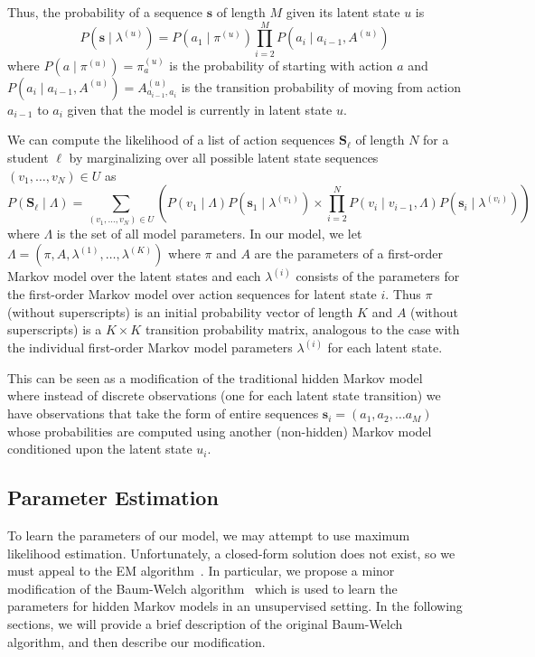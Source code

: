Thus, the probability of a sequence $\mathbf{s}$ of length $M$ given its
latent state $u$ is
\begin{equation}
  P(\mathbf{s} \mid \lambda^{(u)}) = P(a_1 \mid \pi^{(u)}) \prod_{i=2}^M P(a_i \mid
  a_{i-1}, A^{(u)})
\end{equation}
where $P(a \mid \pi^{(u)}) = \pi^{(u)}_a$ is the probability of starting
with action $a$ and $P(a_i \mid a_{i-1}, A^{(u)}) = A^{(u)}_{a_{i-1}, a_i}$
is the transition probability of moving from action $a_{i-1}$ to $a_{i}$
given that the model is currently in latent state $u$.

We can compute the likelihood of a list of action sequences
$\mathbf{S}_\ell$ of length $N$ for a student $\ell$ by marginalizing over
all possible latent state sequences $(v_1, \ldots, v_N) \in U$ as
\begin{equation}
  P(\mathbf{S}_\ell \mid \Lambda)
  = \sum_{(v_1, \ldots, v_N) \in U} \left(P(v_1 \mid \Lambda)
  P(\mathbf{s}_1 \mid \lambda^{(v_1)}) \times \prod_{i=2}^N P(v_i \mid
  v_{i-1}, \Lambda) P(\mathbf{s}_i \mid \lambda^{(v_i)})\right)
\end{equation}
where $\Lambda$ is the set of all model parameters.  In our model, we let
$\Lambda = (\pi, A, \lambda^{(1)}, \ldots, \lambda^{(K)})$ where $\pi$ and
$A$ are the parameters of a first-order Markov model over the latent states
and each $\lambda^{(i)}$ consists of the parameters for the first-order
Markov model over action sequences for latent state $i$. Thus $\pi$
(without superscripts) is an initial probability vector of length $K$ and
$A$ (without superscripts) is a $K \times K$ transition probability matrix,
analogous to the case with the individual first-order Markov model
parameters $\lambda^{(i)}$ for each latent state.

This can be seen as a modification of the traditional hidden Markov
model~\cite{Rabiner:1990:RSR} where instead of discrete observations (one
for each latent state transition) we have observations that take the form
of entire sequences $\mathbf{s}_i = (a_1, a_2, \ldots a_M)$ whose
probabilities are computed using another (non-hidden) Markov model
conditioned upon the latent state $u_i$.

\subsection{Parameter Estimation}
\label{sec:param-estimation}
To learn the parameters of our model, we may attempt to use maximum
likelihood estimation. Unfortunately, a closed-form solution does not
exist, so we must appeal to the EM algorithm~\cite{Dempster:1977:JRSS}. In
particular, we propose a minor modification of the Baum-Welch
algorithm~\cite{Rabiner:1990:RSR} which is used to learn the parameters for
hidden Markov models in an unsupervised setting. In the following sections,
we will provide a brief description of the original Baum-Welch algorithm,
and then describe our modification.

